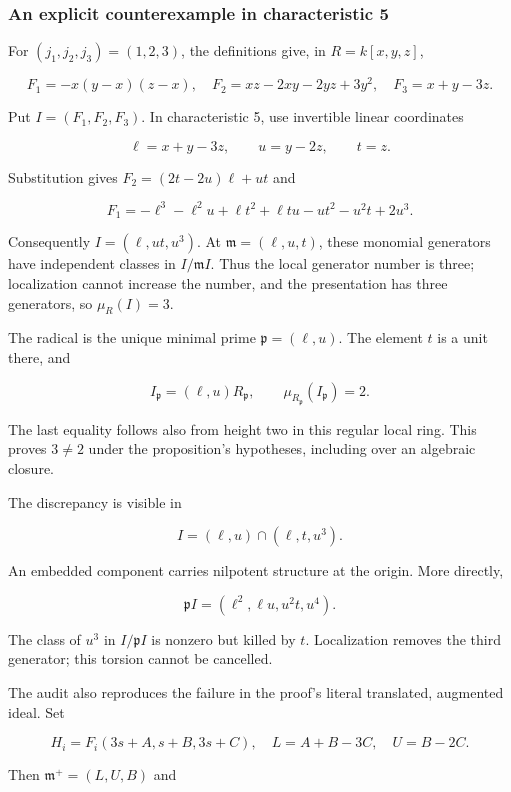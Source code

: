 \documentclass[
  british,
  10pt,
]{article}
\begin{document}
\subsubsection{An explicit counterexample in characteristic
5}\label{an-explicit-counterexample-in-characteristic-5}

For \((j_1,j_2,j_3)=(1,2,3)\), the definitions give, in \(R=k[x,y,z]\),

\[
F_1=-x(y-x)(z-x),\quad
F_2=xz-2xy-2yz+3y^2,\quad F_3=x+y-3z.
\]

Put \(I=(F_1,F_2,F_3)\). In characteristic 5, use invertible linear
coordinates

\[
\ell=x+y-3z,\qquad u=y-2z,\qquad t=z.
\]

Substitution gives \(F_2=(2t-2u)\ell+ut\) and

\[
F_1=-\ell^3-\ell^2u+\ell t^2+\ell tu-ut^2-u^2t+2u^3.
\]

Consequently \(I=(\ell,ut,u^3)\). At \(\mathfrak m=(\ell,u,t)\), these
monomial generators have independent classes in \(I/\mathfrak mI\). Thus
the local generator number is three; localization cannot increase the
number, and the presentation has three generators, so \(\mu_R(I)=3\).

The radical is the unique minimal prime \(\mathfrak p=(\ell,u)\). The
element \(t\) is a unit there, and

\[
I_{\mathfrak p}=(\ell,u)R_{\mathfrak p},\qquad
\mu_{R_{\mathfrak p}}(I_{\mathfrak p})=2.
\]

The last equality follows also from height two in this regular local
ring. This proves \(3\ne2\) under the proposition's hypotheses,
including over an algebraic closure.

The discrepancy is visible in

\[
I=(\ell,u)\cap(\ell,t,u^3).
\]

An embedded component carries nilpotent structure at the origin. More
directly,

\[
\mathfrak pI=(\ell^2,\ell u,u^2t,u^4).
\]

The class of \(u^3\) in \(I/\mathfrak pI\) is nonzero but killed by
\(t\). Localization removes the third generator; this torsion cannot be
cancelled.

The audit also reproduces the failure in the proof's literal translated,
augmented ideal. Set

\[
H_i=F_i(3s+A,s+B,3s+C),\quad L=A+B-3C,\quad U=B-2C.
\]

Then \(\mathfrak m^+=(L,U,B)\) and
\end{document}
